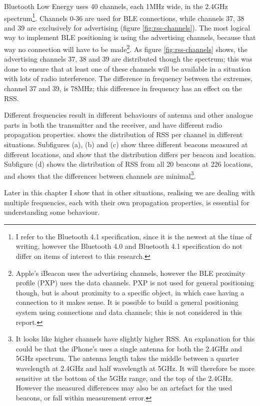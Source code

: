 Bluetooth Low Energy uses 40 channels, each 1MHz wide, in the 2.4GHz spectrum\citep{bluetooth41spec}\footnote{I refer to the Bluetooth 4.1 specification, since it is the newest at the time of writing, however the Bluetooth 4.0 and Bluetooth 4.1 specification do not differ on items of interest to this research.}.
Channels 0-36 are used for BLE connections, while channels 37, 38 and 39 are exclusively for advertising (figure \ref{fig:rss-channels}).
The most logical way to implement BLE positioning is using the advertising channels, because that way no connection will have to be made\footnote{Apple's iBeacon uses the advertising channels, however the BLE proximity profile (PXP) uses the data channels. PXP is not used for general positioning though, but is about proximity to a specific object, in which case having a connection to it makes sense. It is possible to build a general positioning system using connections and data channels; this is not considered in this report.}.
As figure \ref{fig:rss-channels} shows, the advertising channels 37, 38 and 39 are distributed though the spectrum; this was done to ensure that at least one of these channels will be available in a situation with lots of radio interference.
The difference in frequency between the extremes, channel 37 and 39, is 78MHz; this difference in frequency has an effect on the RSS.

Different frequencies result in different behaviours of antenna and other analogue parts in both the transmitter and the receiver, and have different radio propagation properties.
 shows the distribution of RSS per channel in different situations.
Subfigures (a), (b) and (c) show three different beacons measured at different locations, and show that the distribution differs per beacon and location.
Subfigure (d) shows the distribution of RSS from all 20 beacons at 226 locations, and shows that the differences between channels are minimal\footnote{It looks like higher channels have slightly higher RSS.
    An explanation for this could be that the iPhone's uses a single antenna for both the 2.4GHz and 5GHz spectrum.
    The antenna length takes the middle between a quarter wavelength at 2.4GHz and half wavelength at 5GHz.
    It will therefore be more sensitive at the bottom of the 5GHz range, and the top of the 2.4GHz.
    However the measured differences may also be an artefact for the used beacons, or fall within measurement error.
}.

Later in this chapter I show that in other situations, realising we are dealing with multiple frequencies, each with their own propagation properties, is essential for understanding some behaviour.

